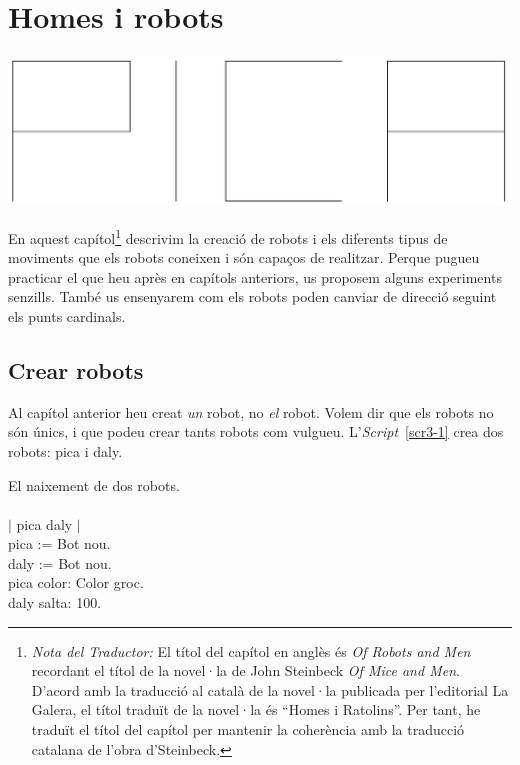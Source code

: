 
\chapter{Homes i robots}
\label{cap3}

\begin{center}
\includegraphics[height=40mm ,width=\textwidth ]{Imatges/figura3-0}
\end{center}

En aquest capítol\footnote{\emph{Nota del Traductor:} El títol del capítol en anglès és \emph{Of Robots and Men} recordant el títol de la novel·la de John Steinbeck \emph{Of Mice and Men}. D'acord amb la traducció al català de la novel·la publicada per l'editorial La Galera, el títol traduït de la novel·la és ``Homes i Ratolins''. Per tant, he traduït el títol del capítol per mantenir la coherència amb la traducció catalana de l'obra d'Steinbeck.} descrivim la creació de robots i els diferents tipus de moviments que els robots coneixen i són capaços de realitzar.  Perque pugueu practicar el que heu après en capítols anteriors, us proposem alguns experiments senzills. També us ensenyarem com els robots poden canviar de direcció seguint els punts cardinals. 

\section{Crear robots}
Al capítol anterior heu creat \emph{un} robot, no \emph{el} robot. Volem dir que els robots no són únics, i que podeu crear tants robots com vulgueu. L'\emph{Script}~\ref{scr3-1} crea dos robots: \textsf{pica} i  \textsf{daly}.  

\begin{script}  El naixement de dos robots.
\noindent
\textsf{\upshape
\\
\\$|$ pica daly $|$\\
pica := Bot nou.\\
daly := Bot nou.\\
pica color: Color groc.\\
daly salta: 100.\\
}
\label{scr3-1}
\end{script}


